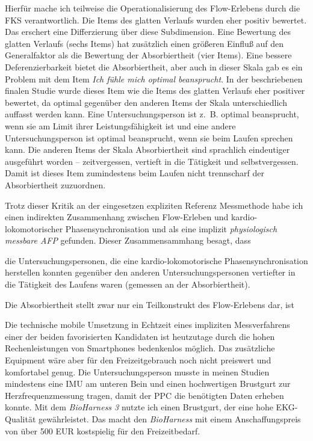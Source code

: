 Hierfür mache ich teilweise die Operationalisierung des Flow-Erlebens durch die \ac{FKS} verantwortlich. Die Items des glatten Verlaufs wurden eher positiv bewertet. Das erschert eine Differzierung über diese Subdimension. Eine Bewertung des glatten Verlaufs (sechs Items) hat zusätzlich einen größeren Einfluß auf den Generalfaktor als die Bewertung der Absorbiertheit (vier Items). Eine bessere Deferenzierbarkeit bietet die Absorbiertheit, aber auch in dieser Skala gab es ein Problem mit dem Item \emph{Ich fühle mich optimal beansprucht}. In der beschriebenen finalen Studie wurde dieses Item wie die Items des glatten Verlaufs eher positiver bewertet, da optimal gegenüber den anderen Items der Skala unterschiedlich auffasst werden kann. Eine Untersuchungsperson ist z.~B. optimal beansprucht, wenn sie am Limit ihrer Leistungsfähigkeit ist und eine andere Untersuchungsperson ist optimal beansprucht, wenn sie beim Laufen sprechen kann. Die anderen Items der Skala Absorbiertheit sind sprachlich eindeutiger ausgeführt worden -- zeitvergessen, vertieft in die Tätigkeit und selbstvergessen. Damit ist dieses Item zumindestens beim Laufen nicht trennscharf der Absorbiertheit zuzuordnen. 

Trotz dieser Kritik an der eingesetzen expliziten Referenz Messmethode habe ich einen indirekten Zusammenhang zwischen Flow-Erleben und kardio-lokomotorischer Phasensynchronisation und als eine implizit \emph{physiologisch messbare \ac{AFP}} gefunden. Dieser Zusammensammhang besagt, dass 

die Untersuchungspersonen, die eine kardio-lokomotorische Phasensynchronisation herstellen konnten gegenüber den anderen Untersuchungspersonen vertiefter in die Tätigkeit des Laufens waren (gemessen an der Absorbiertheit).

Die Absorbiertheit stellt zwar nur ein Teilkonstrukt des Flow-Erlebens dar, ist

Die technische mobile Umsetzung in Echtzeit eines impliziten Messverfahrens einer der beiden favorisierten Kandidaten ist heutzutage durch die hohen Rechenleistungen von Smartphones bedenkenlos möglich. Das zusätzliche Equipment wäre aber für den Freizeitgebrauch noch nicht preiswert und komfortabel genug. Die Untersuchungsperson musste in meinen Studien mindestens eine \ac{IMU} am unteren Bein und einen hochwertigen Brustgurt zur Herzfrequenzmessung tragen, damit der \ac{PPC} die benötigten Daten erheben konnte. Mit dem \emph{BioHarness 3} nutzte ich einen Brustgurt, der eine hohe \ac{EKG}-Qualität gewährleistet. Das macht den \emph{BioHarness} mit einem Anschaffungspreis von über 500 EUR kostspielig für den Freizeitbedarf. 

